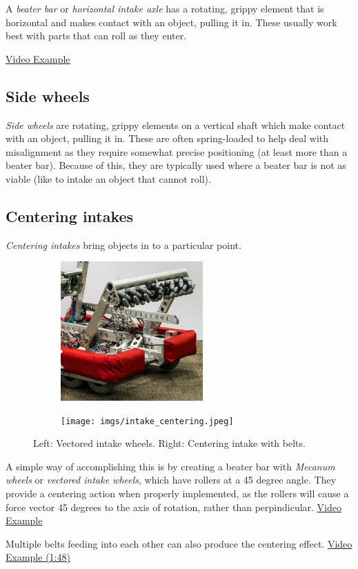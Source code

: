 A \textit{beater bar} or \textit{horizontal intake axle} has a rotating, grippy element that is horizontal and makes contact with an object, pulling it in. These usually work best with parts that can roll as they enter.

\href{https://www.youtube.com/watch?v=LaoZ8L7H65s}{\color{red}\underline{Video Example}}
\subsection{Side wheels}
\textit{Side wheels} are rotating, grippy elements on a vertical shaft which make contact with an object, pulling it in. These are often spring-loaded to help deal with misalignment as they require somewhat precise positioning (at least more than a beater bar). Because of this, they are typically used where a beater bar is not as viable (like to intake an object that cannot roll).
\subsection{Centering intakes}
\textit{Centering intakes} bring objects in to a particular point.

\begin{figure}[H]
\begin{subfigure}[b]{.45\linewidth}
\includegraphics[height=2.1in]{imgs/intake_vectored.png}
\end{subfigure}\begin{subfigure}[b]{.45\linewidth}
\texttt{[image: imgs/intake\_centering.jpeg]}
\end{subfigure}
\caption{Left: Vectored intake wheels. Right: Centering intake with belts.}
\end{figure}


\begin{asparaitem}[a)]
\item A simple way of accomplishing this is by creating a beater bar with \textit{Mecanum wheels} or \textit{vectored intake wheels}, which have rollers at a 45 degree angle. They provide a centering action when properly implemented, as the rollers will cause a force vector 45 degrees to the axis of rotation, rather than perpindicular. \href{https://www.youtube.com/watch?v=WwxNSiHXREo}{\color{red}\underline{Video Example}}
\item Multiple belts feeding into each other can also produce the centering effect. \href{https://youtu.be/p0_YOm5fjC8?t=107}{\color{red}\underline{Video Example (1:48)}}
\end{asparaitem}

